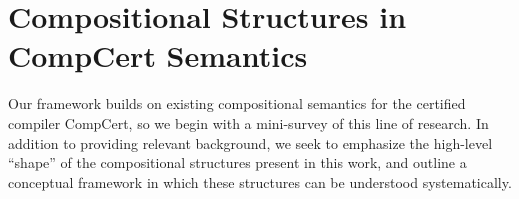 \documentclass[acmsmall,screen,review,anonymous]{acmart}
\begin{document}
%
%
%
%
%
%
%
%


\section{Compositional Structures in CompCert Semantics} %


Our framework builds on existing
compositional semantics for the certified compiler CompCert,
so we begin with a mini-survey of this line of research.
In addition to providing relevant background,
we seek to emphasize the high-level ``shape''
of the compositional structures present in this work,
and outline a conceptual framework in which these structures can be understood
systematically.
\end{document}
